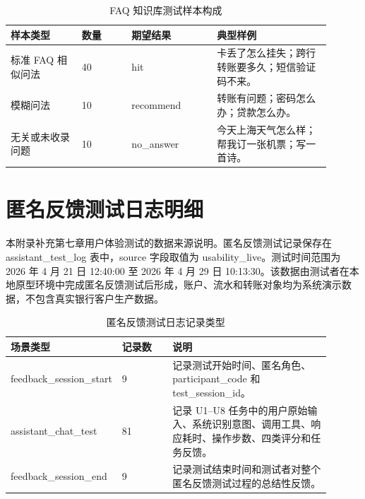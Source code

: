 \documentclass[bachelor, print]{xduthesis}
\begin{document}
\begin{appendix}
\begin{table}[H]
    \centering
    \caption{FAQ 知识库测试样本构成}
    \label{tab:faq-sample-appendix}
    \small
    \setlength{\tabcolsep}{4pt}
    \begin{tabular}{|p{0.2\linewidth}|p{0.14\linewidth}|p{0.24\linewidth}|p{0.32\linewidth}|}
        \hline
        样本类型 & 数量 & 期望结果 & 典型样例 \\
        \hline
        标准 FAQ 相似问法 & 40 & hit & 卡丢了怎么挂失；跨行转账要多久；短信验证码不来。 \\
        \hline
        模糊问法 & 10 & recommend & 转账有问题；密码怎么办；贷款怎么办。 \\
        \hline
        无关或未收录问题 & 10 & no\_answer & 今天上海天气怎么样；帮我订一张机票；写一首诗。 \\
        \hline
    \end{tabular}
\end{table}

\section{匿名反馈测试日志明细}
\label{app:usability-log-details}

本附录补充第七章用户体验测试的数据来源说明。匿名反馈测试记录保存在 assistant\_test\_log 表中，source 字段取值为 usability\_live。测试时间范围为 2026 年 4 月 21 日 12:40:00 至 2026 年 4 月 29 日 10:13:30。该数据由测试者在本地原型环境中完成匿名反馈测试后形成，账户、流水和转账对象均为系统演示数据，不包含真实银行客户生产数据。

\begin{table}[H]
    \centering
    \caption{匿名反馈测试日志记录类型}
    \label{tab:usability-log-scenario-appendix}
    \small
    \setlength{\tabcolsep}{4pt}
    \begin{tabular}{|p{0.24\linewidth}|p{0.16\linewidth}|p{0.5\linewidth}|}
        \hline
        场景类型 & 记录数 & 说明 \\
        \hline
        feedback\_session\_start & 9 & 记录测试开始时间、匿名角色、participant\_code 和 test\_session\_id。 \\
        \hline
        assistant\_chat\_test & 81 & 记录 U1--U8 任务中的用户原始输入、系统识别意图、调用工具、响应耗时、操作步数、四类评分和任务反馈。 \\
        \hline
        feedback\_session\_end & 9 & 记录测试结束时间和测试者对整个匿名反馈测试过程的总结性反馈。 \\
        \hline
    \end{tabular}
\end{table}


\end{appendix}
\end{document}
